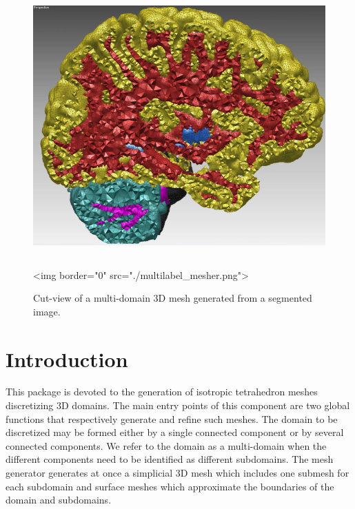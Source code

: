\begin{figure}[ht]
\begin{center}
 \begin{ccTexOnly}
   \includegraphics[height=10cm]{Mesh_3/multilabel_mesher}
 \end{ccTexOnly}
 \begin{ccHtmlOnly}
   <img border="0" src="./multilabel_mesher.png">
 \end{ccHtmlOnly}
 \caption{Cut-view of a multi-domain 3D mesh generated from a segmented image.}
  \label{figure:multilabel_mesher}
\end{center}
\end{figure}

\section{Introduction}
\label{Mesh_3_section_intro}

This package is devoted to the generation of  isotropic tetrahedron
meshes discretizing 3D domains. The main entry points of this component are
two global  functions that respectively generate
and refine such meshes.
The domain to be discretized may be
formed either by a single connected component
or by several
connected components. We refer to the domain as a multi-domain
when the different components need to be
 identified  as different subdomains.
The mesh generator generates at once a simplicial 
3D mesh which includes one submesh for each subdomain
and surface meshes which approximate the boundaries 
 of the domain and subdomains.


